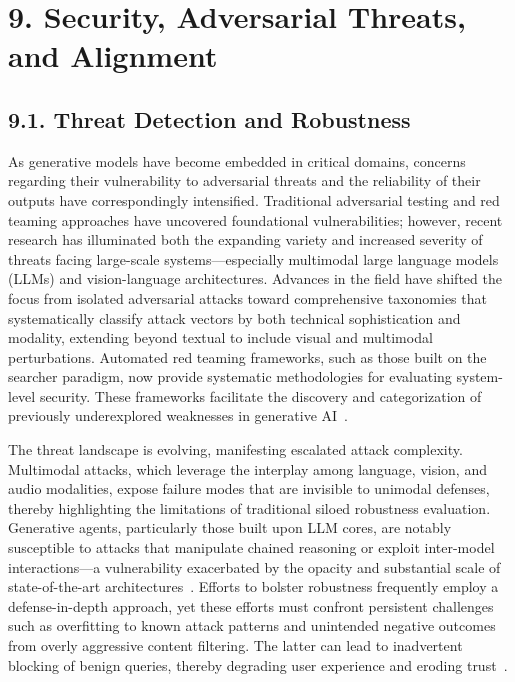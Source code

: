 \documentclass[11pt]{article}
\begin{document}
\section{9. Security, Adversarial Threats, and Alignment}

\subsection{9.1. Threat Detection and Robustness}

As generative models have become embedded in critical domains, concerns regarding their vulnerability to adversarial threats and the reliability of their outputs have correspondingly intensified. Traditional adversarial testing and red teaming approaches have uncovered foundational vulnerabilities; however, recent research has illuminated both the expanding variety and increased severity of threats facing large-scale systems—especially multimodal large language models (LLMs) and vision-language architectures. Advances in the field have shifted the focus from isolated adversarial attacks toward comprehensive taxonomies that systematically classify attack vectors by both technical sophistication and modality, extending beyond textual to include visual and multimodal perturbations. Automated red teaming frameworks, such as those built on the searcher paradigm, now provide systematic methodologies for evaluating system-level security. These frameworks facilitate the discovery and categorization of previously underexplored weaknesses in generative AI~\cite{ref67, ref85}.

The threat landscape is evolving, manifesting escalated attack complexity. Multimodal attacks, which leverage the interplay among language, vision, and audio modalities, expose failure modes that are invisible to unimodal defenses, thereby highlighting the limitations of traditional siloed robustness evaluation. Generative agents, particularly those built upon LLM cores, are notably susceptible to attacks that manipulate chained reasoning or exploit inter-model interactions—a vulnerability exacerbated by the opacity and substantial scale of state-of-the-art architectures~\cite{ref85}. Efforts to bolster robustness frequently employ a defense-in-depth approach, yet these efforts must confront persistent challenges such as overfitting to known attack patterns and unintended negative outcomes from overly aggressive content filtering. The latter can lead to inadvertent blocking of benign queries, thereby degrading user experience and eroding trust~\cite{ref67}.
\end{document}
